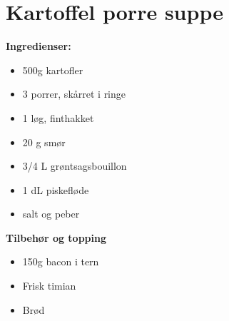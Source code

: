 \documentclass{book}
\begin{document}
\newpage
{}
\newpage \section{Kartoffel porre suppe}
\begin{minipage}[t]{0.5\textwidth}
\textbf{Ingredienser:}
\begin{itemize}
    \item 500g kartofler
    \item 3 porrer, skårret i ringe
    \item 1 løg, finthakket
    \item 20 g smør
    \item 3/4 L grøntsagsbouillon
    \item 1 dL piskefløde
    \item salt og peber
\end{itemize}
\textbf{Tilbehør og topping}
\begin{itemize}
    \item 150g bacon i tern
    \item Frisk timian
    \item Brød
\end{itemize}
\end{minipage}
\end{document}
